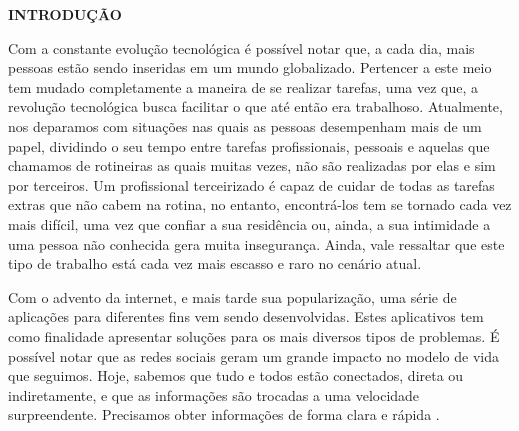 \begin{center}
	\vspace{1.2em}
	\textbf{\large INTRODUÇÃO}
	\vspace{2.9em}
\end{center}
\thispagestyle{empty}


\par Com a constante evolução tecnológica é possível notar que, a cada dia, mais pessoas estão sendo inseridas em um mundo globalizado. Pertencer a este meio tem mudado completamente a maneira de se realizar tarefas, uma vez que, a revolução tecnológica busca facilitar o que até então era trabalhoso. Atualmente, nos deparamos com situações nas quais as pessoas desempenham mais de um papel, dividindo o seu tempo entre tarefas profissionais, pessoais e aquelas que chamamos de rotineiras as quais muitas vezes, não são realizadas por elas e sim por terceiros. %
Um profissional terceirizado é capaz de cuidar de todas as tarefas extras que não cabem na rotina, no entanto, encontrá-los tem se tornado cada vez mais difícil, uma vez que confiar a sua residência ou, ainda, a sua intimidade a uma pessoa não conhecida gera muita insegurança. Ainda, vale ressaltar que este tipo de trabalho está cada vez mais escasso e raro no cenário atual.

\par Com o advento da internet, e mais tarde sua popularização, uma série de aplicações para diferentes fins vem sendo desenvolvidas. Estes aplicativos tem como finalidade apresentar soluções para os mais diversos tipos de problemas. É possível notar que as redes sociais geram um grande impacto no modelo de vida que seguimos. Hoje, sabemos que tudo e todos estão conectados, direta ou indiretamente, e que as informações são trocadas a uma velocidade surpreendente. Precisamos obter informações de forma clara e rápida \cite{barbosa_why_people_use_social_network}.

